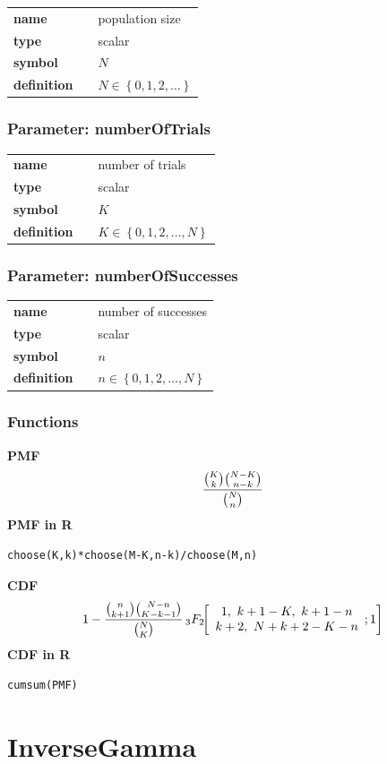 \documentclass{article}
\begin{document}
\noindent\begin{tabular}{p{2cm}cl}
\textbf{name} & & population size \\
\textbf{type} & & scalar \\
\textbf{symbol} & & $N$  \\
\textbf{definition} & & $N \in \left\{0,1,2,\dots\right\}$
\end{tabular}
\subsubsection*{Parameter: numberOfTrials}

\noindent\begin{tabular}{p{2cm}cl}
\textbf{name} & & number of trials \\
\textbf{type} & & scalar \\
\textbf{symbol} & & $K$  \\
\textbf{definition} & & $K \in \left\{0,1,2,\dots,N\right\} $
\end{tabular}
\subsubsection*{Parameter: numberOfSuccesses}

\noindent\begin{tabular}{p{2cm}cl}
\textbf{name} & & number of successes \\
\textbf{type} & & scalar \\
\textbf{symbol} & & $n$  \\
\textbf{definition} & & $n \in \left\{0,1,2,\dots,N\right\}$
\end{tabular}
\subsubsection*{Functions}

\smallskip \noindent \hspace{.2cm} \textbf{PMF} 
\begin{equation*}{{{K \choose k} {{N-K} \choose {n-k}}}\over {N \choose n}}\end{equation*}
\smallskip \noindent \hspace{.2cm} \textbf{PMF in R}  
\begin{verbatim}choose(K,k)*choose(M-K,n-k)/choose(M,n)\end{verbatim}
\smallskip \noindent \hspace{.2cm} \textbf{CDF} 
\begin{equation*}1-{{{n \choose {k+1}}{{N-n} \choose {K-k-1}}}\over {N \choose K}} \,_3F_2\!\!\left[\begin{array}{c}1,\ k+1-K,\ k+1-n \\ k+2,\ N+k+2-K-n\end{array};1\right]\end{equation*}
\smallskip \noindent \hspace{.2cm} \textbf{CDF in R} 
\begin{verbatim}cumsum(PMF)\end{verbatim}
\smallskip\section*{InverseGamma} 
\end{document}
